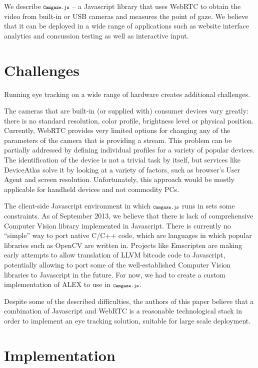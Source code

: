 \documentclass[annual]{acmsiggraph}
\newcommand{\Acronym}[1]{\ensuremath{{\small{\texttt{#1}}}}}
\newcommand{\Name}{\Acronym{Camgaze.js}} \newcommand{\False}{\Constant{false}}
\newcommand{\Constant}[1]{\ensuremath{\small{\texttt{#1}}}}
\begin{document}
We describe $\Name$ -- a Javascript library that uses WebRTC to obtain the
video from built-in or USB cameras and measures the point of gaze. We believe
that it can be deployed in a wide range of applications such as website
interface analytics and concussion testing as well as interactive input.


\section{Challenges}

Running eye tracking on a wide range of hardware creates additional challenges.

The cameras that are built-in (or supplied with) consumer devices vary greatly:
there is no standard resolution, color profile, brightness level or physical
position. Currently, WebRTC provides very limited options for changing any of
the parameters of the camera that is providing a stream. This problem can be
partially addressed by defining individual profiles for a variety of popular
devices. The identification of the device is not a trivial task by itself, but
services like DeviceAtlas \cite{DeviceAtlas2013} solve it by looking at a
variety of factors, such as browser’s User Agent and screen resolution.
Unfortunately, this approach would be mostly applicable for handheld devices
and not commodity PCs.

The client-side Javascript environment in which $\Name$ runs in sets some
constraints. As of September 2013, we believe that there is lack of
comprehensive Computer Vision library implemented in Javascript. There is
currently no “simple” way to port native C/C++ code, which are languages in
which popular libraries such as OpenCV are written in. Projects like Emscripten
are making early attempts to allow translation of LLVM bitcode code to
Javascript, potentially allowing to port some of the well-established Computer
Vision libraries to Javascript in the future. For now, we had to create a
custom implementation of {ALEX} to use in $\Name$.

Despite some of the described difficulties, the authors of this paper believe
that a combination of Javascript and WebRTC is a reasonable technological stack
in order to implement an eye tracking solution, suitable for large scale
deployment.


\section{Implementation}
\end{document}
